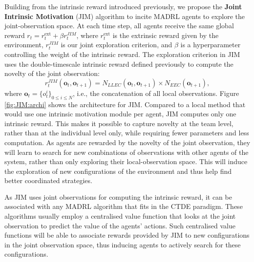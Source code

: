 Building from the intrinsic reward introduced previously, we propose the \textbf{Joint Intrinsic Motivation} (JIM) algorithm to incite MADRL agents to explore the joint-observation space. At each time step, all agents receive the same global reward $r_t=r^{\text{ext}}_t+\beta r^{JIM}_t$, where $r^{\text{ext}}_t$ is the extrinsic reward given by the environment, $r^{JIM}_t$ is our joint exploration criterion, and $\beta$ is a hyperparameter controlling the weight of the intrinsic reward. The exploration criterion in JIM uses the double-timescale intrinsic reward defined previously to compute the novelty of the joint observation:
\begin{equation}\label{eq:JIM:JIM}
    r_t^{JIM}(\mathbf{o}_t,\mathbf{o}_{t+1})=N_{LLEC}(\mathbf{o}_t,\mathbf{o}_{t+1})\times N_{EEC}(\mathbf{o}_{t+1}),
\end{equation}
where $\mathbf{o}_t=\{o_t^i\}_{0\leq i\leq N}$, i.e., the concatenation of all local observations. Figure \ref{fig:JIM:archi} shows the architecture for JIM. Compared to a local method that would use one intrinsic motivation module per agent, JIM computes only one intrinsic reward. This makes it possible to capture novelty at the team level, rather than at the individual level only, while requiring fewer parameters and less computation. As agents are rewarded by the novelty of the joint observation, they will learn to search for new combinations of observations with other agents of the system, rather than only exploring their local-observation space. This will induce the exploration of new configurations of the environment and thus help find better coordinated strategies.

As JIM uses joint observations for computing the intrinsic reward, it can be associated with any MADRL algorithm that fits in the CTDE paradigm. These algorithms usually employ a centralised value function \citep{Lowe2017_MADDPG,Rashid2018_QMIX,Yu2021_MAPPO} that looks at the joint observation to predict the value of the agents' actions. Such centralised value functions will be able to associate rewards provided by JIM to new configurations in the joint observation space, thus inducing agents to actively search for these configurations. 

